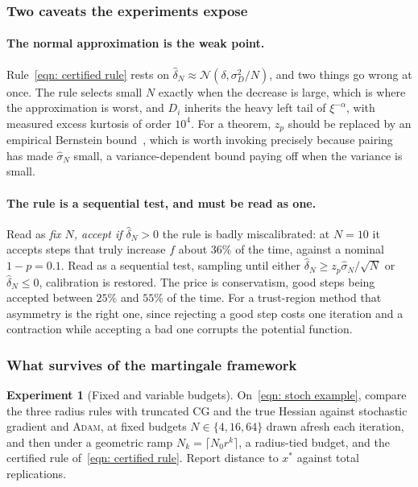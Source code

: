 \documentclass[11pt]{article}
\theoremstyle{plain}
\theoremstyle{definition}
\newtheorem{experiment}{Experiment}
\theoremstyle{remark}
\numberwithin{equation}{section}
\begin{document}
\subsubsection{Two caveats the experiments expose}

\paragraph{The normal approximation is the weak point.}
Rule~\eqref{eqn: certified rule} rests on $\hat\delta_N \approx \mathcal{N}(\delta,
\sigma_D^2/N)$, and two things go wrong at once. The rule selects small $N$ exactly when the
decrease is large, which is where the approximation is worst, and $D_i$ inherits the heavy left
tail of $\xi^{-\alpha}$, with measured excess kurtosis of order $10^4$. For a theorem, $z_p$
should be replaced by an empirical Bernstein bound~\citep{MaurerPontil09}, which is worth
invoking precisely because pairing has made $\hat\sigma_N$ small, a variance-dependent bound
paying off when the variance is small.

\paragraph{The rule is a sequential test, and must be read as one.}
Read as \emph{fix $N$, accept if $\hat\delta_N > 0$} the rule is badly miscalibrated: at $N = 10$
it accepts steps that truly increase $f$ about $36\%$ of the time, against a nominal $1-p = 0.1$.
Read as a sequential test, sampling until either $\hat\delta_N \geq z_p\hat\sigma_N/\sqrt{N}$ or
$\hat\delta_N \leq 0$, calibration is restored. The price is conservatism, good steps being
accepted between $25\%$ and $55\%$ of the time. For a trust-region method that asymmetry is the
right one, since rejecting a good step costs one iteration and a contraction while accepting a
bad one corrupts the potential function.

\subsubsection{What survives of the martingale framework}

\begin{experiment}[Fixed and variable budgets]
\label{exp: stoch budgets}
  On~\eqref{eqn: stoch example}, compare the three radius rules with truncated CG and the true
  Hessian against stochastic gradient and \textsc{Adam}, at fixed budgets
  $N \in \{4,16,64\}$ drawn afresh each iteration, and then under a geometric ramp
  $N_k = \lceil N_0 r^k \rceil$, a radius-tied budget, and the certified rule
  of~\eqref{eqn: certified rule}. Report distance to $x^*$ against total replications.
\end{experiment}
\end{document}
